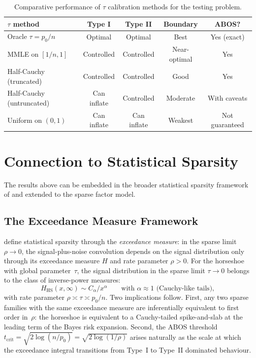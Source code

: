 \documentclass[12pt]{article}
\newcommand{\tcrit}{t_{\mathrm{crit}}}
\begin{document}
\begin{table}[H]
\centering
\small
\renewcommand{\arraystretch}{1.3}
\begin{tabular}{@{}lcccc@{}}
\toprule
\textbf{$\tau$ method} & \textbf{Type I} & \textbf{Type II} & \textbf{Boundary} & \textbf{ABOS?} \\
\midrule
Oracle $\tau = p_0/n$       & Optimal & Optimal & Best & Yes (exact) \\
MMLE on $[1/n, 1]$         & Controlled & Controlled & Near-optimal & Yes \\
Half-Cauchy (truncated)     & Controlled & Controlled & Good & Yes \\
Half-Cauchy (untruncated)   & Can inflate & Controlled & Moderate & With caveats \\
Uniform on $(0,1)$          & Can inflate & Can inflate & Weakest & Not guaranteed \\
\bottomrule
\end{tabular}
\caption{Comparative performance of $\tau$ calibration methods for the testing problem.}
\label{tab:tau-comparison}
\end{table}


\section{Connection to Statistical Sparsity}\label{sec:sparsity}

The results above can be embedded in the broader statistical sparsity framework of \citet{mccullagh2018statistical} and extended to the sparse factor model.

\subsection{The Exceedance Measure Framework}\label{sec:exceedance}

\citet{mccullagh2018statistical} define statistical sparsity through the \emph{exceedance measure}: in the sparse limit $\rho \to 0$, the signal-plus-noise convolution depends on the signal distribution only through its exceedance measure $H$ and rate parameter $\rho > 0$. For the horseshoe with global parameter~$\tau$, the signal distribution in the sparse limit $\tau \to 0$ belongs to the class of inverse-power measures:
\begin{equation}\label{eq:exceedance}
  H_{\mathrm{HS}}(x, \infty) \sim C_\alpha / x^\alpha \qquad\text{with } \alpha \approx 1 \text{ (Cauchy-like tails)},
\end{equation}
with rate parameter $\rho \asymp \tau \asymp p_0/n$. Two implications follow. First, any two sparse families with the same exceedance measure are inferentially equivalent to first order in~$\rho$: the horseshoe is equivalent to a Cauchy-tailed spike-and-slab at the leading term of the Bayes risk expansion. Second, the ABOS threshold $\tcrit = \sqrt{2\log(n/p_0)} = \sqrt{2\log(1/\rho)}$ arises naturally as the scale at which the exceedance integral transitions from Type~I to Type~II dominated behaviour.
\end{document}
